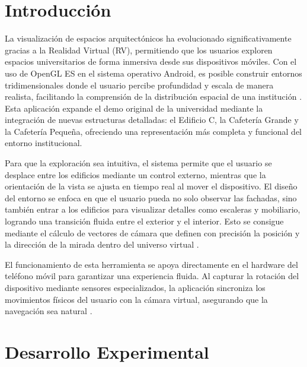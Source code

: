 \documentclass[conference]{IEEEtran}
\begin{document}


\section{Introducción}

La visualización de espacios arquitectónicos ha evolucionado significativamente gracias a la Realidad Virtual (RV), permitiendo que los usuarios exploren espacios universitarios de forma inmersiva desde sus dispositivos móviles. Con el uso de OpenGL ES en el sistema operativo Android, es posible construir entornos tridimensionales donde el usuario percibe profundidad y escala de manera realista, facilitando la comprensión de la distribución espacial de una institución \cite{Chin2012}. Esta aplicación expande el demo original de la universidad mediante la integración de nuevas estructuras detalladas: el Edificio C, la Cafetería Grande y la Cafetería Pequeña, ofreciendo una representación más completa y funcional del entorno institucional.

Para que la exploración sea intuitiva, el sistema permite que el usuario se desplace entre los edificios mediante un control externo, mientras que la orientación de la vista se ajusta en tiempo real al mover el dispositivo. El diseño del entorno se enfoca en que el usuario pueda no solo observar las fachadas, sino también entrar a los edificios para visualizar detalles como escaleras y mobiliario, logrando una transición fluida entre el exterior y el interior. Esto se consigue mediante el cálculo de vectores de cámara que definen con precisión la posición y la dirección de la mirada dentro del universo virtual \cite{LearnOpenGLCamera2026}.

El funcionamiento de esta herramienta se apoya directamente en el hardware del teléfono móvil para garantizar una experiencia fluida. Al capturar la rotación del dispositivo mediante sensores especializados, la aplicación sincroniza los movimientos físicos del usuario con la cámara virtual, asegurando que la navegación sea natural \cite{AndroidSensors2026}.

\section{Desarrollo Experimental}
\end{document}
